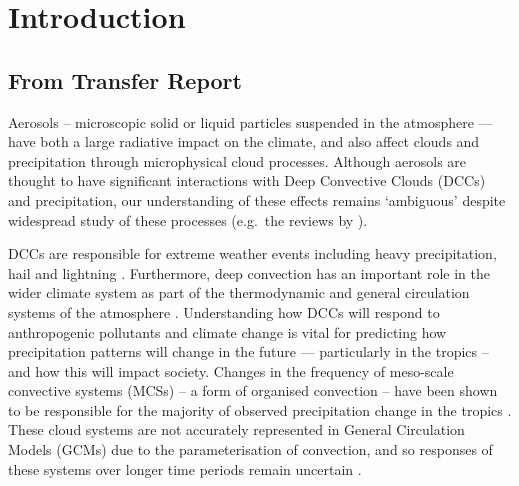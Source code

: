 \chapter{Introduction}

\section{From Transfer Report}

Aerosols – microscopic solid or liquid particles suspended in the atmosphere --- have both a large radiative  impact on the climate, and also affect clouds and precipitation through microphysical cloud processes. 
Although aerosols are thought to have significant interactions with Deep Convective Clouds (DCCs) and precipitation, our understanding of these effects remains ‘ambiguous’ \citep{IPCCCloudsAeorosolsBoucher2013} despite widespread study of these processes (e.g.\ the reviews by \citet{levin_aerosol_2008, tao_impact_2012, fan_review_2016}).

DCCs are responsible for extreme weather events including heavy precipitation, hail and lightning \citep{westra_future_2014}. Furthermore, deep convection has an important role in the wider climate system as part of the thermodynamic and general circulation systems of the atmosphere \citep{weisman_mesoscale_2015}. Understanding how DCCs will respond to anthropogenic pollutants and climate change is vital for predicting how precipitation patterns will change in the future --- particularly in the tropics – and how this will impact society. 
Changes in the frequency of meso-scale convective systems (MCSs) – a form of organised convection – have been shown to be responsible for the majority of observed precipitation change in the tropics \citep{tan_increases_2015}. 
These cloud systems are not accurately represented in General Circulation Models (GCMs) due to the parameterisation of convection, and so responses of these systems over longer time periods remain uncertain \citep{ogorman_precipitation_2015}.

